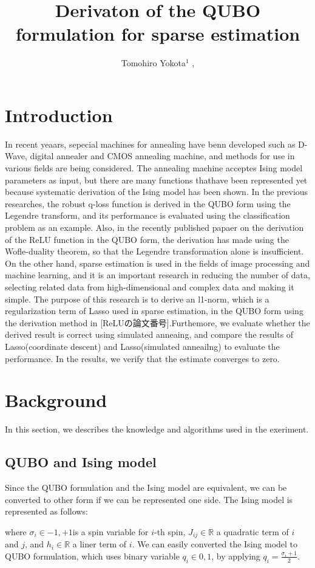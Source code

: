 \documentclass[fp,twocolumn]{jpsj3}
\title{Derivaton of the QUBO formulation for sparse estimation}
\author{Tomohiro Yokota$^1$%
  , }
\begin{document}
\maketitle

\section{Introduction}
In recent yeaars, sepecial machines for annealing have benn developed such as D-Wave, digital annealer and CMOS annealing machine, and methods for use in various fields are being considered. The annealing machine acceptes Ising model parameters as input, but there are many functions thathave been represented yet because systematic derivation of the Ising model has been shown.
In the previous researches, the robust q-loss function is derived in the QUBO form using the Legendre transform, and its performance is evaluated using the classification problem as an example. Also, in the recently published papaer on the derivation of the ReLU function in the QUBO form, the derivation has made using the Wofle-duality theorem, so that the Legendre transformation alone is insufficient.
On the other hand, sparse estimation is used in the fields of image processing and machine learning, and it is an important research in reducing the number of data, selecting related data from high-dimensional and complex data and making it simple.
The purpose of this research is to derive an l1-norm, which is a regularization term of Lasso used in sparse estimation, in the QUBO form using the derivation method in [ReLUの論文番号].Furthemore, we evaluate whether the derived result is correct using simulated anneaing, and compare the results of Lasso(coordinate descent) and Lasso(simulated anneailng) to evaluate the performance. In the results, we verify that the estimate converges to zero.

\section{Background}
In this section, we describes the knowledge and algorithms used in the exeriment.

\subsection{QUBO and Ising model} %
Since the QUBO formulation and the Ising model are equivalent, we can be converted to other form if we can be represented one side. The Ising model is represented as follows:
\begin{}
\end{}
where $\sigma_{i}\in {-1,+1}$is a spin variable for $i$-th spin, $J_{ij}\in \mathbb{R}$ a quadratic term of $i$ and $j$, and $h_{i}\in \mathbb{R}$ a liner term of $i$. We can easily converted the Ising model to QUBO formulation, which uses binary variable $q_{i}\in {0,1}$, by applying $q_{i}=\frac{\sigma_{i}+1}{2}$. 
\end{document}
